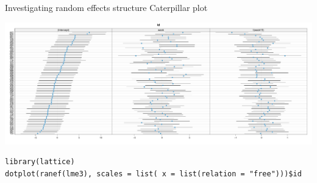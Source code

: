 \documentclass[aspectratio=169]{beamer}
\begin{document}
\begin{frame}[fragile]{Investigating random effects structure}
  {Caterpillar plot}
  \vspace{-.4cm}
    \begin{center}
      \includegraphics[scale=.25]{../figures/hdrs-caterpillar}
  \end{center}
  \vspace{-.3cm}
\begin{lstlisting}
library(lattice)
dotplot(ranef(lme3), scales = list( x = list(relation = "free")))$id
\end{lstlisting}
\end{frame}
\end{document}
